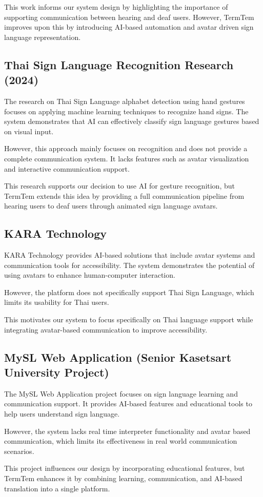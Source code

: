 This work informs our system design by highlighting the importance of supporting communication between hearing and deaf users. However, TermTem improves upon this by introducing AI-based automation and avatar driven sign language representation.

\subsection{Thai Sign Language Recognition Research (2024)}

The research on Thai Sign Language alphabet detection using hand gestures focuses on applying machine learning techniques to recognize hand signs. The system demonstrates that AI can effectively classify sign language gestures based on visual input.

However, this approach mainly focuses on recognition and does not provide a complete communication system. It lacks features such as avatar visualization and interactive communication support.

This research supports our decision to use AI for gesture recognition, but TermTem extends this idea by providing a full communication pipeline from hearing users to deaf users through animated sign language avatars.

\subsection{KARA Technology}

KARA Technology provides AI-based solutions that include avatar systems and communication tools for accessibility. The system demonstrates the potential of using avatars to enhance human-computer interaction.

However, the platform does not specifically support Thai Sign Language, which limits its usability for Thai users.

This motivates our system to focus specifically on Thai language support while integrating avatar-based communication to improve accessibility.
\newpage
\subsection{MySL Web Application (Senior Kasetsart University Project)}

The MySL Web Application project focuses on sign language learning and communication support. It provides AI-based features and educational tools to help users understand sign language.

However, the system lacks real time interpreter functionality and avatar based communication, which limits its effectiveness in real world communication scenarios.

This project influences our design by incorporating educational features, but TermTem enhances it by combining learning, communication, and AI-based translation into a single platform.